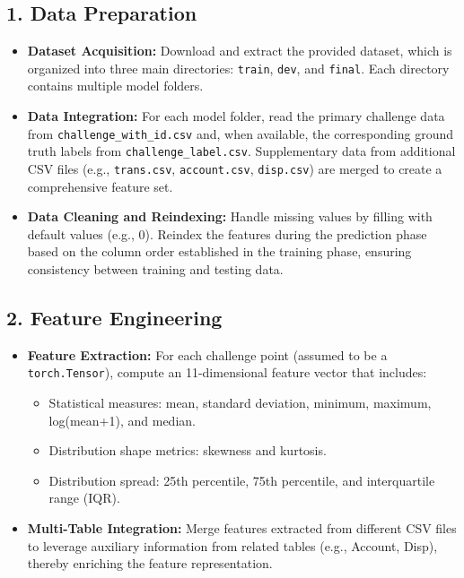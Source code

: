 \documentclass[12pt]{article}
\begin{document}
\subsection*{1. Data Preparation}
\begin{itemize}
    \item \textbf{Dataset Acquisition:}  
    Download and extract the provided dataset, which is organized into three main directories: \texttt{train}, \texttt{dev}, and \texttt{final}. Each directory contains multiple model folders.
    
    \item \textbf{Data Integration:}  
    For each model folder, read the primary challenge data from \texttt{challenge\_with\_id.csv} and, when available, the corresponding ground truth labels from \texttt{challenge\_label.csv}. Supplementary data from additional CSV files (e.g., \texttt{trans.csv}, \texttt{account.csv}, \texttt{disp.csv}) are merged to create a comprehensive feature set.
    
    \item \textbf{Data Cleaning and Reindexing:}  
    Handle missing values by filling with default values (e.g., 0). Reindex the features during the prediction phase based on the column order established in the training phase, ensuring consistency between training and testing data.
\end{itemize}

\subsection*{2. Feature Engineering}
\begin{itemize}
    \item \textbf{Feature Extraction:}  
    For each challenge point (assumed to be a \texttt{torch.Tensor}), compute an 11-dimensional feature vector that includes:
    \begin{itemize}
        \item Statistical measures: mean, standard deviation, minimum, maximum, log(mean+1), and median.
        \item Distribution shape metrics: skewness and kurtosis.
        \item Distribution spread: 25th percentile, 75th percentile, and interquartile range (IQR).
    \end{itemize}
    
    \item \textbf{Multi-Table Integration:}  
    Merge features extracted from different CSV files to leverage auxiliary information from related tables (e.g., Account, Disp), thereby enriching the feature representation.
\end{itemize}
\end{document}
